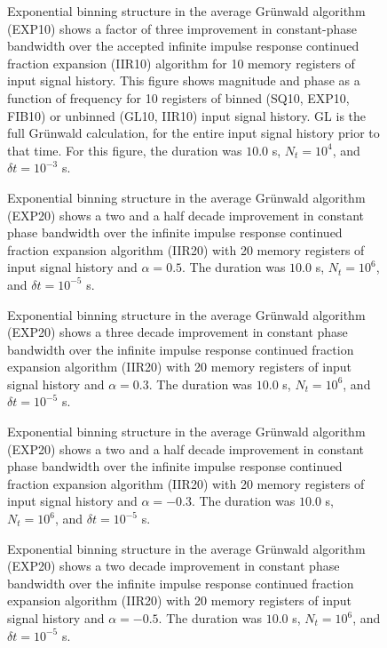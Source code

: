 \begin{figure}
\caption{Exponential binning structure in the average Gr{\"u}nwald algorithm (EXP10) shows a factor of three improvement in constant-phase bandwidth over the accepted infinite impulse response continued fraction expansion (IIR10) algorithm for 10 memory registers of input signal history. This figure shows magnitude and phase as a function of frequency for 10
  registers of binned (SQ10, EXP10, FIB10) or unbinned (GL10, IIR10)
  input signal history. GL is the full Gr{\"u}nwald calculation, for the
  entire input signal history prior to that time. For this figure, the duration was $10.0$ s, $N_t=10^4$, and $\delta t = 10^{-3}$ s.}
\label{fig:bode10p05}
\end{figure}

\begin{figure}
\caption{Exponential binning structure in the average Gr{\"u}nwald algorithm (EXP20) shows a two and a half decade improvement in constant phase bandwidth over the infinite impulse response continued fraction expansion algorithm (IIR20) with 20 memory registers of input signal history and $\alpha=0.5$. The duration was $10.0$ s, $N_t=10^6$, and $\delta t = 10^{-5}$ s.}
\label{fig:bode20p05}
\end{figure}

\begin{figure}

\caption{Exponential binning structure in the average Gr{\"u}nwald algorithm (EXP20) shows a three decade improvement in constant phase bandwidth over the infinite impulse response continued fraction expansion algorithm (IIR20) with 20 memory registers of input signal history and $\alpha=0.3$. The duration was $10.0$ s, $N_t=10^6$, and $\delta t = 10^{-5}$ s.}
\label{fig:bode20p03}
\end{figure}

\begin{figure}

\caption{Exponential binning structure in the average Gr{\"u}nwald algorithm (EXP20) shows a two and a half decade improvement in constant phase bandwidth over the infinite impulse response continued fraction expansion algorithm (IIR20) with 20 memory registers of input signal history and $\alpha=-0.3$. The duration was $10.0$ s, $N_t=10^6$, and $\delta t = 10^{-5}$ s.}
\label{fig:bode20m03}
\end{figure}

\begin{figure}
\caption{Exponential binning structure in the average Gr{\"u}nwald algorithm (EXP20) shows a two decade improvement in constant phase bandwidth over the infinite impulse response continued fraction expansion algorithm (IIR20) with 20 memory registers of input signal history and $\alpha=-0.5$. The duration was $10.0$ s, $N_t=10^6$, and $\delta t = 10^{-5}$ s. }
\label{fig:bode20m05}
\end{figure}